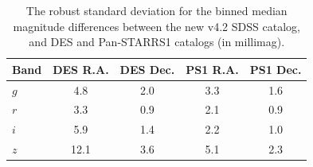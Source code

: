 \documentclass[fleqn,usenatbib]{mnras}
\begin{document}
\begin{table}
	\centering
	\caption{The robust standard deviation for the binned median magnitude differences between
the new v4.2 SDSS catalog, and DES and Pan-STARRS1 catalogs (in millimag).}
	\label{tab:DESPS1}
	\begin{tabular}{l|c|c|c|c} %
		\hline
		Band & DES R.A. & DES Dec. & PS1 R.A. & PS1 Dec. \\
		\hline
       $g$        &        4.8    &      2.0   &        3.3    &      1.6        \\
       $r$         &        3.3    &      0.9   &        2.1    &      0.9         \\  
       $i$         &        5.9    &      1.4   &        2.2    &      1.0         \\ 
       $z$        &       12.1    &     3.6   &        5.1    &      2.3         \\ 
		\hline
	\end{tabular}
\end{table}
\end{document}
